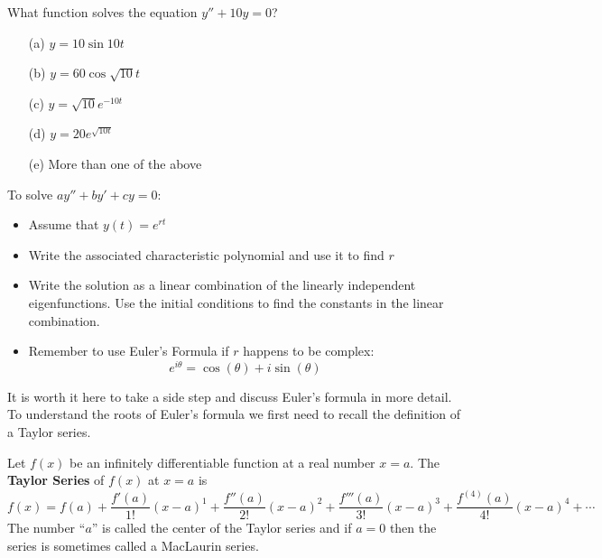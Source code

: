 \begin{problem}
    What function solves the equation $y'' + 10 y =0$?
\begin{enumerate}
    \item[(a)] $y = 10 \sin 10 t$
    \item[(b)] $y = 60 \cos \sqrt{10} t$
    \item[(c)] $y = \sqrt{10} e^{-10 t}$
    \item[(d)] $y = 20 e^{\sqrt{10 t}}$
    \item[(e)] More than one of the above
\end{enumerate}
\end{problem}
%             

\begin{technique}\label{tech:second_order_ode}
    To solve $a y'' + by' + c y = 0$:
    \begin{itemize}
        \item Assume that $y(t) = e^{rt}$
        \item Write the associated characteristic polynomial and use it to find $r$
        \item Write the solution as a linear combination of the linearly independent
            eigenfunctions.  Use the initial conditions to find the constants in the
            linear combination.
        \item Remember to use Euler's Formula if $r$ happens to be complex: 
            \[ e^{i\theta} =\cos(\theta) + i\sin(\theta) \]
    \end{itemize}
\end{technique}

It is worth it here to take a side step and discuss Euler's formula in more detail.  To
understand the roots of Euler's formula we first need to recall the definition of a Taylor
series.
\begin{definition}
    Let $f(x)$ be an infinitely differentiable function at a real number $x=a$.  The {\bf
    Taylor Series} of $f(x)$ at $x=a$ is
    \[ f(x) = f(a) + \frac{f'(a)}{1!}(x-a)^1 + \frac{f''(a)}{2!}(x-a)^2
        +\frac{f'''(a)}{3!}(x-a)^3 +\frac{f^{(4)}(a)}{4!}(x-a)^4 + \cdots \]
    The number ``$a$'' is called the center of the Taylor series and if $a=0$ then the
    series is sometimes called a MacLaurin series.
\end{definition}

